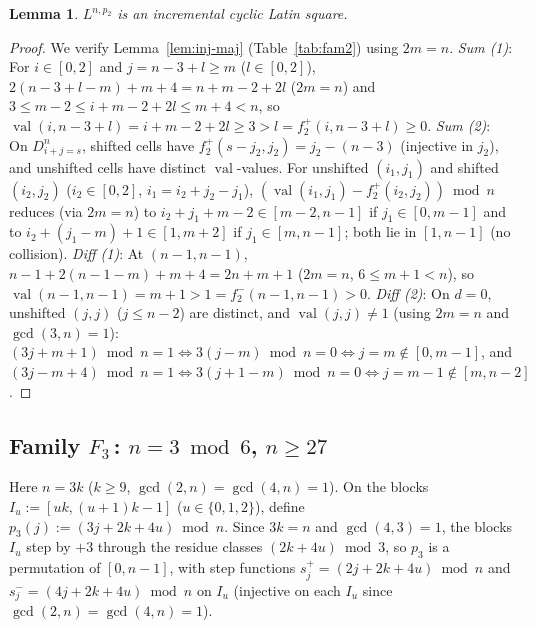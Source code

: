 \documentclass[10pt,a4paper]{article}
\newtheorem{lemma}[theorem]{Lemma}
\theoremstyle{remark}
\newcommand{\val}{\operatorname{val}}
\begin{document}
\begin{lemma}\label{lem:fam2}
$L^{n,p_2}$ is an incremental cyclic Latin square.
\end{lemma}

\begin{proof}
We verify Lemma~\ref{lem:inj-maj} (Table~\ref{tab:fam2}) using $2m = n$.
\emph{Sum (1)}: For $i \in [0,2]$ and $j = n - 3 + l \ge m$ ($l \in [0,2]$),
$2(n - 3 + l - m) + m + 4 = n + m - 2 + 2l$ ($2m = n$) and $3 \le m - 2 \le i + m - 2 + 2l \le m + 4 < n$,
so $\val(i,n-3+l) = i + m - 2 + 2l \ge 3 > l = f^+_2(i,n-3+l) \ge 0$.
\emph{Sum (2)}: On $D^n_{i+j=s}$, shifted cells have $f^+_2(s-j_2,j_2) = j_2 - (n-3)$ (injective in
$j_2$), and unshifted cells have distinct $\val$-values. For unshifted $(i_1,j_1)$ and shifted
$(i_2,j_2)$ ($i_2 \in [0,2]$, $i_1 = i_2 + j_2 - j_1$), $(\val(i_1,j_1) - f^+_2(i_2,j_2)) \bmod n$
reduces (via $2m = n$) to $i_2 + j_1 + m - 2 \in [m-2, n-1]$ if $j_1 \in [0,m-1]$ and to
$i_2 + (j_1 - m) + 1 \in [1, m+2]$ if $j_1 \in [m,n-1]$; both lie in $[1,n-1]$ (no collision).
\emph{Diff (1)}: At $(n-1,n-1)$, $n - 1 + 2(n - 1 - m) + m + 4 = 2n + m + 1$ ($2m = n$, $6 \le m + 1 < n$),
so $\val(n-1,n-1) = m + 1 > 1 = f^-_2(n-1,n-1) > 0$.
\emph{Diff (2)}: On $d = 0$, unshifted $(j,j)$ ($j \le n-2$) are distinct, and $\val(j,j) \ne 1$
(using $2m = n$ and $\gcd(3,n) = 1$):
$(3j + m + 1) \bmod n = 1 \iff 3(j - m) \bmod n = 0 \iff j = m \notin [0,m-1]$, and
$(3j - m + 4) \bmod n = 1 \iff 3(j + 1 - m) \bmod n = 0 \iff j = m - 1 \notin [m,n-2]$.
\end{proof}

\subsection[Family 3]{Family $F_3$\,: $n = 3 \bmod 6$, $n \ge 27$}

Here $n = 3k$ ($k \ge 9$, $\gcd(2,n) = \gcd(4,n) = 1$). On the blocks $I_u := [uk, (u+1)k-1]$
($u \in \{0,1,2\}$), define $p_3(j) := (3j + 2k + 4u) \bmod n$. Since $3k = n$ and $\gcd(4,3) = 1$,
the blocks $I_u$ step by $+3$ through the residue classes $(2k + 4u) \bmod 3$, so $p_3$ is a
permutation of $[0,n-1]$, with step functions $s^+_j = (2j + 2k + 4u) \bmod n$ and
$s^-_j = (4j + 2k + 4u) \bmod n$ on $I_u$ (injective on each $I_u$ since $\gcd(2,n) = \gcd(4,n) = 1$).
\end{document}
